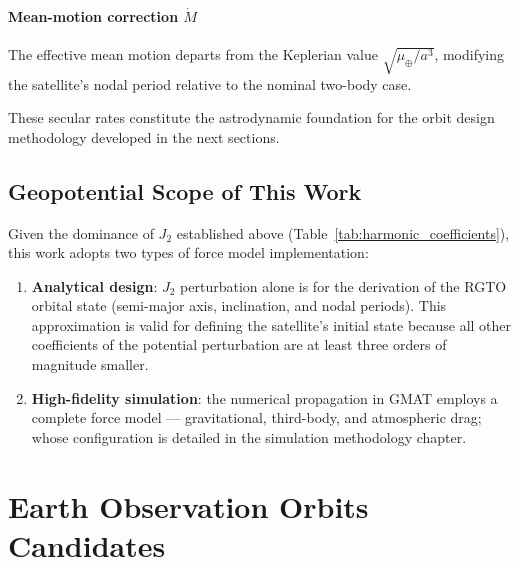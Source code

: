 \paragraph{\textbf{Mean-motion correction} $\dot{M}$}
 The effective mean motion departs from the Keplerian value $\sqrt{\mu_\oplus/a^3}$, modifying the satellite's nodal period relative to the nominal two-body case.


These secular rates constitute the astrodynamic foundation for the orbit design methodology developed in the next sections.

\subsection{Geopotential Scope of This Work}
\label{sec:otherharmonics}

Given the dominance of $J_2$ established above (Table~\ref{tab:harmonic_coefficients}), this work adopts two types of force model implementation:

\begin{enumerate}
    \item \textbf{Analytical design}: $J_2$ perturbation alone is for the derivation of the RGTO orbital state (semi-major axis, inclination, and nodal periods). This approximation is valid for defining the satellite's initial state because all other coefficients of the potential perturbation are at least three orders of magnitude smaller. 
    \item \textbf{High-fidelity simulation}: the numerical propagation in GMAT employs a complete force model --- gravitational, third-body, and atmospheric drag;  whose configuration is detailed in the simulation methodology chapter.
\end{enumerate}

\section{Earth Observation Orbits Candidates}
\label{72-earth_orbservation_orbit_candidates}



